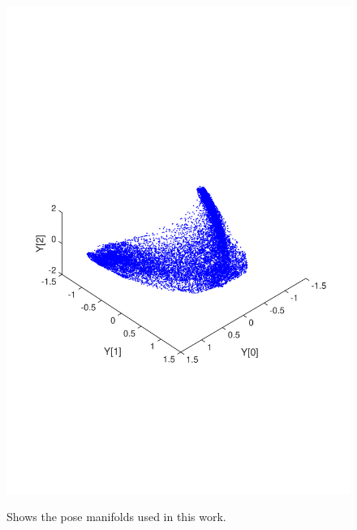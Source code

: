 \documentclass[11pt]{article} %
\begin{document}
\begin{figure}
{{\includegraphics*[trim={0cm 5cm 0cm 9cm},clip,width=0.7\linewidth,clip]{1-12maniWFlips.pdf}}}%
\caption{Shows the pose manifolds used in this work.}
\label{fig:manifolds}
\end{figure}
\end{document}
